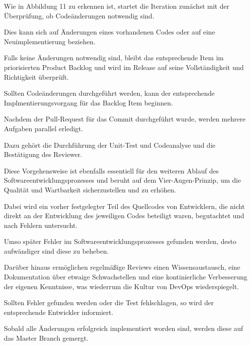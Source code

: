Wie in Abbildung 11 zu erkennen ist, startet die Iteration zunächst mit der Überprüfung, ob Codeänderungen notwendig sind. 

Dies kann sich auf Änderungen eines vorhandenen Codes oder auf eine Neuimplementierung beziehen. 

Falls keine Änderungen notwendig sind, bleibt das entsprechende Item im priorisierten Product Backlog und wird im Release auf seine Vollständigkeit und Richtigkeit überprüft.

Sollten Codeänderungen durchgeführt werden, kann der entsprechende Implmentierungsvorgang für das Backlog Item beginnen. 

Nachdem der Pull-Request für das Commit durchgeführt wurde, werden mehrere Aufgaben parallel erledigt. 

Dazu gehört die Durchführung der Unit-Test und Codeanalyse und die Bestätigung des Reviewer.

Diese Vorgehensweise ist ebenfalls essentiell für den weiteren Ablauf des Softwareentwicklungsprozesses und beruht auf dem Vier-Augen-Prinzip, um die Qualität und Wartbarkeit sicherzustellen und zu erhöhen.  

Dabei wird ein vorher festgelegter Teil des Quellcodes von Entwicklern, die nicht direkt an der Entwicklung des jeweiligen Codes beteiligt waren, begutachtet und nach Fehlern untersucht. 

Umso später Fehler im Softwareentwicklungsprozesses gefunden werden, desto aufwändiger sind diese zu beheben. 

Darüber hinaus ermöglichen regelmäßige Reviews einen Wissensaustausch, eine Dokumentation über etwaige Schwachstellen und eine kontinierliche Verbesserung der eigenen Kenntnisse, was wiederrum die Kultur von DevOps wiederspiegelt. 

Sollten Fehler gefunden werden oder die Test fehlschlagen, so wird der entsprechende Entwickler informiert. 

Sobald alle Änderungen erfolgreich implementiert worden sind, werden diese auf das Master Branch gemergt. 

